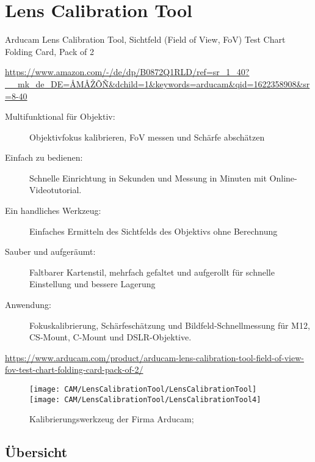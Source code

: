%
%
%



\chapter{Lens Calibration Tool}


Arducam Lens Calibration Tool, Sichtfeld (Field of View, FoV) Test Chart Folding Card, Pack of 2

\url{https://www.amazon.com/-/de/dp/B0872Q1RLD/ref=sr_1_40?__mk_de_DE=ÅMÅŽÕÑ&dchild=1&keywords=arducam&qid=1622358908&sr=8-40}

\begin{description}
  \item[Multifunktional für Objektiv:] Objektivfokus kalibrieren, FoV messen und Schärfe abschätzen
  \item[Einfach zu bedienen:] Schnelle Einrichtung in Sekunden und Messung in Minuten mit Online-Videotutorial.
  \item[Ein handliches Werkzeug:] Einfaches Ermitteln des Sichtfelds des Objektivs ohne Berechnung
  \item[Sauber und aufgeräumt:] Faltbarer Kartenstil, mehrfach gefaltet und aufgerollt für schnelle Einstellung und bessere Lagerung
  \item[Anwendung:] Fokuskalibrierung, Schärfeschätzung und Bildfeld-Schnellmessung für M12, CS-Mount, C-Mount und DSLR-Objektive.

\end{description}
\url{https://www.arducam.com/product/arducam-lens-calibration-tool-field-of-view-fov-test-chart-folding-card-pack-of-2/}


\begin{figure}
  \begin{center}
    \texttt{[image: CAM/LensCalibrationTool/LensCalibrationTool]}
    \quad 
    \texttt{[image: CAM/LensCalibrationTool/LensCalibrationTool4]}
  
    \caption{Kalibrierungswerkzeug der Firma Arducam; \cite{Arducam:2021}}
  \end{center}    
\end{figure}

\section{Übersicht}

